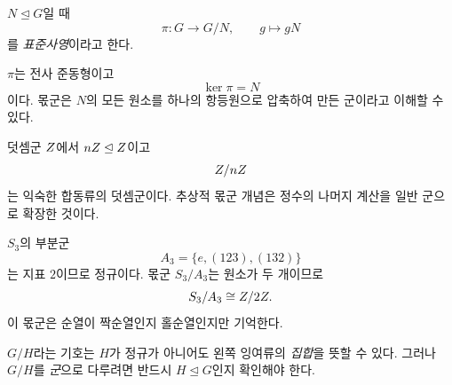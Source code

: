 \begin{definition}[표준사영]
$N\trianglelefteq G$일 때
\[
  \pi:G\to G/N,\qquad g\mapsto gN
\]
를 \emph{표준사영}이라고 한다.
\end{definition}

$\pi$는 전사 준동형이고
\[
  \ker\pi=N
\]
이다. 몫군은 $N$의 모든 원소를 하나의 항등원으로 압축하여 만든 군이라고 이해할 수 있다.

\begin{example}
덧셈군 $Z$에서 $nZ\trianglelefteq Z$이고
\[
  Z/nZ
\]
는 익숙한 합동류의 덧셈군이다. 추상적 몫군 개념은 정수의 나머지 계산을 일반 군으로 확장한 것이다.
\end{example}

\begin{example}
$S_3$의 부분군
\[
  A_3=\{e,(123),(132)\}
\]
는 지표 $2$이므로 정규이다. 몫군 $S_3/A_3$는 원소가 두 개이므로
\[
  S_3/A_3\cong Z/2Z.
\]
이 몫군은 순열이 짝순열인지 홀순열인지만 기억한다.
\end{example}

\begin{pitfall}
$G/H$라는 기호는 $H$가 정규가 아니어도 왼쪽 잉여류의 \emph{집합}을 뜻할 수 있다. 그러나 $G/H$를 \emph{군}으로 다루려면 반드시 $H\trianglelefteq G$인지 확인해야 한다.
\end{pitfall}
